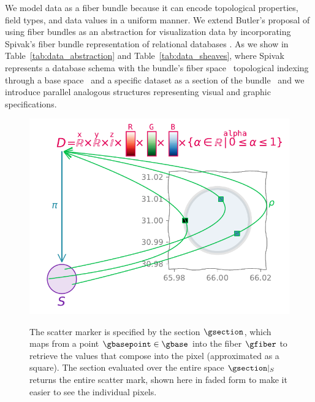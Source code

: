 \documentclass[preprint]{vgtc}
\begin{document}
We model data as a fiber bundle because it can encode topological properties, field types, and data values in a uniform manner.  We extend Butler's proposal of using fiber bundles as an abstraction for visualization data \cite{butlerVectorBundleClassesForm1992,butlerVisualizationModelBased1989} by incorporating Spivak's fiber bundle representation of relational databases \cite{spivakDatabasesAreCategories2010,spivakSimplicialDatabases2009}. As we show in Table~\ref{tab:data_abstraction} and Table~\ref{tab:data_sheaves}, where Spivak represents a database schema with the bundle's fiber space \dfiber\, topological indexing through a base space \dbase\, and a specific dataset as a section of the bundle \dsection\, and we introduce parallel analogous structures representing visual and graphic specifications.

\begin{figure}[!h]
    \includegraphics[width=.5\textwidth, alt={illustration of how a pixel in a scatter plot is the return value of a function from the graphic indexing space to the fiber space that specifies the display space}]{fb_rho.pdf}
    \caption{The scatter marker is specified by the section $\gsection$, which maps from a point $\gbasepoint \in \gbase$ into the fiber $\gfiber$ to retrieve the values that compose into the pixel (approximated as a square). The section evaluated over the entire space $\gsection\vert_{S}$ returns the entire scatter mark, shown here in faded form to make it easier to see the individual pixels.}\label{fig:fiber_bundle}
\end{figure}
\end{document}
